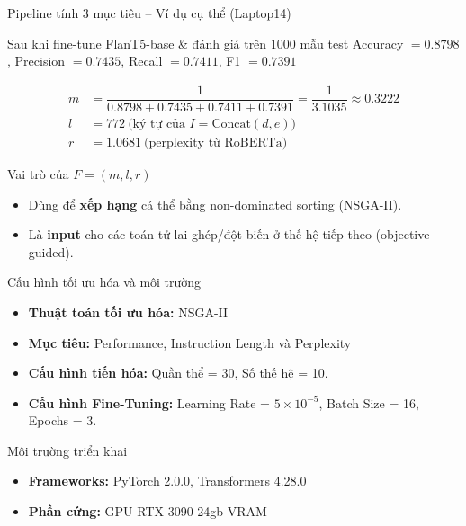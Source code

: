 \documentclass[12pt,xcolor=table]{beamer}
\begin{document}
\begin{frame}{Pipeline tính 3 mục tiêu -- Ví dụ cụ thể (Laptop14)}
    \begin{block}{Sau khi fine-tune FlanT5-base \& đánh giá trên 1000 mẫu test}
        Accuracy $= 0.8798$, \quad Precision $= 0.7435$, \quad Recall $= 0.7411$, \quad F1 $= 0.7391$
    \end{block}
    \vspace{-0.3cm}
    \begin{align*}
        m &= \dfrac{1}{0.8798+0.7435+0.7411+0.7391} = \dfrac{1}{3.1035} \approx 0.3222 \\
        l &= 772 \ \text{(ký tự của } I=\text{Concat}(d,e)\text{)}\\
        r &= 1.0681 \ \text{(perplexity từ RoBERTa)}
    \end{align*}
    \vspace{-0.4cm}
    \begin{block}{Vai trò của $F=(m,l,r)$}
        \begin{itemize}
            \item Dùng để \textbf{xếp hạng} cá thể bằng non-dominated sorting (NSGA-II).
            \item Là \textbf{input} cho các toán tử lai ghép/đột biến ở thế hệ tiếp theo (objective-guided).
        \end{itemize}
    \end{block}
\end{frame}

\begin{frame}{Cấu hình tối ưu hóa và môi trường}
    \begin{itemize}
        \item \textbf{Thuật toán tối ưu hóa:} NSGA-II
        \item \textbf{Mục tiêu:} Performance, Instruction Length và Perplexity
        \item \textbf{Cấu hình tiến hóa:} Quần thể = 30, Số thế hệ = 10.
        \item \textbf{Cấu hình Fine-Tuning:} Learning Rate = $5 \times 10^{-5}$, Batch Size = 16, Epochs = 3.
    \end{itemize}
    \vspace{0.2cm}

    \begin{block}{Môi trường triển khai}
        \begin{itemize}
            \item \textbf{Frameworks:} PyTorch 2.0.0, Transformers 4.28.0
            \item \textbf{Phần cứng:} GPU RTX 3090 24gb VRAM
        \end{itemize}
    \end{block}
\end{frame}
\end{document}
